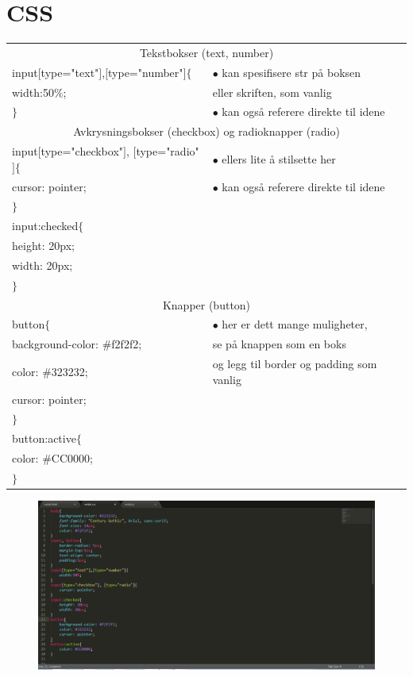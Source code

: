 \documentclass[a4paper, norsk, 10pt]{article}
\newcommand\tab[1][1cm]{\hspace*{#1}}
\begin{document}
\clearpage
\section*{CSS}
\begin{tabular}{|p{10cm}|p{6cm}|}
\hline
\multicolumn{2}{|c|}{\large{Tekstbokser (text, number) } \cellcolor{lightgray}} \\
input$[$type="text"$]$,$[$type="number"$]\{$ & $\bullet$ kan spesifisere str på boksen \\
\tab width:50$\%$; & eller skriften, som vanlig\\
$\}$ & $\bullet$ kan også referere direkte til idene\\
\multicolumn{2}{|c|}{\large{Avkrysningsbokser (checkbox) og radioknapper (radio) } \cellcolor{lightgray}} \\
input$[$type="checkbox"$]$, $[$type="radio"$]\{$ & $\bullet$ ellers lite å stilsette  her \\
\tab cursor: pointer;& $\bullet$ kan også referere direkte til idene\\
$\}$& \\
input:checked$\{$& \\
\tab height: 20px;& \\
\tab width: 20px;& \\
$\}$& \\
\multicolumn{2}{|c|}{\large{Knapper (button)} \cellcolor{lightgray}} \\
button$\{$ & $\bullet$ her er dett mange muligheter, \\
\tab background-color: $\#$f2f2f2; & se på knappen som en boks \\
\tab color:  $\#$323232;& og legg til border og padding som vanlig \\
\tab cursor: pointer;&\\
$\}$ &\\
button:active$\{$&\\
\tab color:  $\#$CC0000;&\\
$\}$&\\
\hline
\end{tabular}
\begin{figure}[h!]
\includegraphics[width=0.75\linewidth]{css1.png}
\end{figure}
\end{document}
